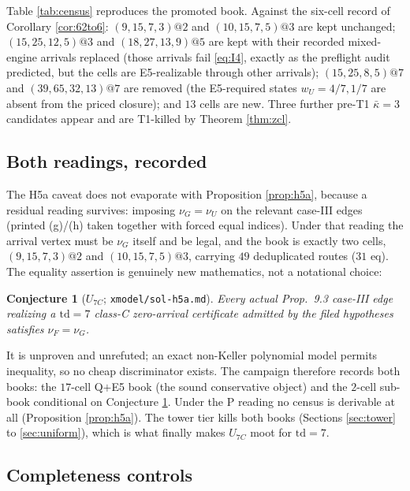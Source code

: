 \documentclass[11pt]{article}
\newtheorem{conjecture}[theorem]{Conjecture}
\theoremstyle{definition}
\theoremstyle{remark}
\newcommand{\kb}{\bar\kappa}
\begin{document}
Table \ref{tab:census} reproduces the promoted book. Against the six-cell record of Corollary \ref{cor:62to6}: $(9,15,7,3)@2$ and $(10,15,7,5)@3$ are kept unchanged; $(15,25,12,5)@3$ and $(18,27,13,9)@5$ are kept with their recorded mixed-engine arrivals replaced (those arrivals fail \eqref{eq:I4}, exactly as the preflight audit predicted, but the cells are E5-realizable through other arrivals); $(15,25,8,5)@7$ and $(39,65,32,13)@7$ are removed (the E5-required states $w_U=4/7,1/7$ are absent from the priced closure); and $13$ cells are new. Three further pre-T1 $\kb=3$ candidates appear and are T1-killed by Theorem \ref{thm:zcl}.

\subsection{Both readings, recorded}

The H5a caveat does not evaporate with Proposition \ref{prop:h5a}, because a residual reading survives: imposing $\nu_G=\nu_U$ on the relevant case-III edges (printed (g)/(h) taken together with forced equal indices). Under that reading the arrival vertex must be $\nu_G$ itself and be legal, and the book is exactly two cells, $(9,15,7,3)@2$ and $(10,15,7,5)@3$, carrying $49$ deduplicated routes ($31$ eq). The equality assertion is genuinely new mathematics, not a notational choice:

\begin{conjecture}[$U_{7C}$; \texttt{xmodel/sol-h5a.md}]\label{conj:u7c}
Every actual Prop.~9.3 case-III edge realizing a $\mathrm{td}=7$ class-C zero-arrival certificate admitted by the filed hypotheses satisfies $\nu_F=\nu_G$.
\end{conjecture}

It is unproven and unrefuted; an exact non-Keller polynomial model permits inequality, so no cheap discriminator exists. The campaign therefore records both books: the $17$-cell Q$+$E5 book (the sound conservative object) and the $2$-cell sub-book conditional on Conjecture \ref{conj:u7c}. Under the P reading no census is derivable at all (Proposition \ref{prop:h5a}). The tower tier kills both books (Sections \ref{sec:tower} to \ref{sec:uniform}), which is what finally makes $U_{7C}$ moot for $\mathrm{td}=7$.

\subsection{Completeness controls}
\end{document}
